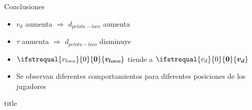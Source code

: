 \documentclass{beamer}
\renewcommand\vec[1]{\ifstrequal{#1}{0}{\ensuremath{\mathbf{0}}}{\ensuremath{\boldsymbol{#1}}}}
\begin{document}
        \begin{frame}{Conclusiones}
            \begin{itemize}
                \item $v_d$ aumenta $\Rightarrow$ $d_{pelota-loco}$ aumenta
                \item $\tau$ aumenta $\Rightarrow$ $d_{pelota-loco}$ disminuye
                \item $\vec{v_{loco}}$ tiende a $\vec{v_d}$
                \item Se observan diferentes comportamientos para diferentes posiciones de los jugadores
            \end{itemize}
        \end{frame}

        \begin{frame}
            \begin{beamercolorbox}[sep=8pt,center]{title}
            \end{beamercolorbox}
        \end{frame}
\end{document}
